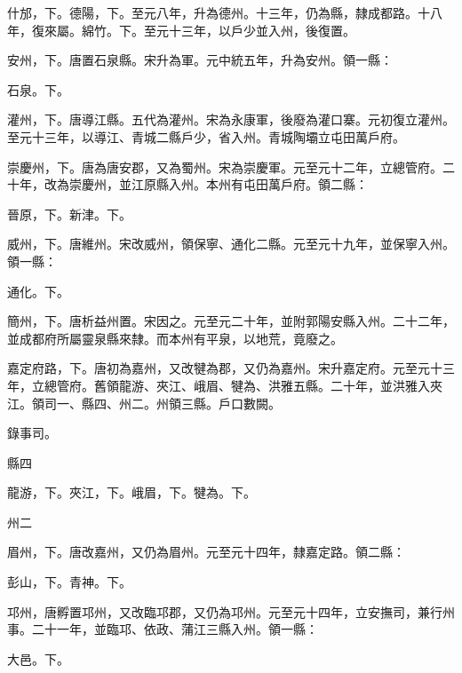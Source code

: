 \begin{pinyinscope}
 什邡，下。德陽，下。至元八年，升為德州。十三年，仍為縣，隸成都路。十八年，復來屬。綿竹。下。至元十三年，以戶少並入州，後復置。



 安州，下。唐置石泉縣。宋升為軍。元中統五年，升為安州。領一縣：



 石泉。下。



 灌州，下。唐導江縣。五代為灌州。宋為永康軍，後廢為灌口寨。元初復立灌州。至元十三年，以導江、青城二縣戶少，省入州。青城陶壩立屯田萬戶府。



 崇慶州，下。唐為唐安郡，又為蜀州。宋為崇慶軍。元至元十二年，立總管府。二十年，改為崇慶州，並江原縣入州。本州有屯田萬戶府。領二縣：



 晉原，下。新津。下。



 威州，下。唐維州。宋改威州，領保寧、通化二縣。元至元十九年，並保寧入州。領一縣：



 通化。下。



 簡州，下。唐析益州置。宋因之。元至元二十年，並附郭陽安縣入州。二十二年，並成都府所屬靈泉縣來隸。而本州有平泉，以地荒，竟廢之。



 嘉定府路，下。唐初為嘉州，又改犍為郡，又仍為嘉州。宋升嘉定府。元至元十三年，立總管府。舊領龍游、夾江、峨眉、犍為、洪雅五縣。二十年，並洪雅入夾江。領司一、縣四、州二。州領三縣。戶口數闕。



 錄事司。



 縣四



 龍游，下。夾江，下。峨眉，下。犍為。下。



 州二



 眉州，下。唐改嘉州，又仍為眉州。元至元十四年，隸嘉定路。領二縣：



 彭山，下。青神。下。



 邛州，唐孵置邛州，又改臨邛郡，又仍為邛州。元至元十四年，立安撫司，兼行州事。二十一年，並臨邛、依政、蒲江三縣入州。領一縣：



 大邑。下。




\end{pinyinscope}
